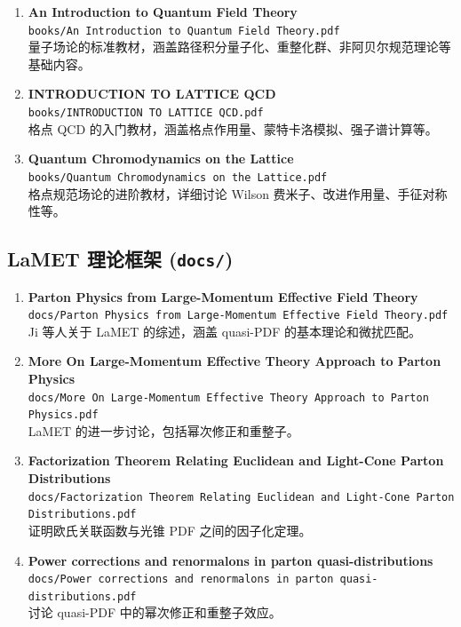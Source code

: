 \documentclass[12pt,a4paper]{ctexart}
\begin{document}
\begin{enumerate}
    \item \textbf{An Introduction to Quantum Field Theory} \\
    \texttt{books/An Introduction to Quantum Field Theory.pdf} \\
    量子场论的标准教材，涵盖路径积分量子化、重整化群、非阿贝尔规范理论等基础内容。

    \item \textbf{INTRODUCTION TO LATTICE QCD} \\
    \texttt{books/INTRODUCTION TO LATTICE QCD.pdf} \\
    格点 QCD 的入门教材，涵盖格点作用量、蒙特卡洛模拟、强子谱计算等。

    \item \textbf{Quantum Chromodynamics on the Lattice} \\
    \texttt{books/Quantum Chromodynamics on the Lattice.pdf} \\
    格点规范场论的进阶教材，详细讨论 Wilson 费米子、改进作用量、手征对称性等。
\end{enumerate}

\subsection{LaMET 理论框架 (\texttt{docs/})}

\begin{enumerate}
    \item \textbf{Parton Physics from Large-Momentum Effective Field Theory} \\
    \texttt{docs/Parton Physics from Large-Momentum Effective Field Theory.pdf} \\
    Ji 等人关于 LaMET 的综述，涵盖 quasi-PDF 的基本理论和微扰匹配。

    \item \textbf{More On Large-Momentum Effective Theory Approach to Parton Physics} \\
    \texttt{docs/More On Large-Momentum Effective Theory Approach to Parton Physics.pdf} \\
    LaMET 的进一步讨论，包括幂次修正和重整子。

    \item \textbf{Factorization Theorem Relating Euclidean and Light-Cone Parton Distributions} \\
    \texttt{docs/Factorization Theorem Relating Euclidean and Light-Cone Parton Distributions.pdf} \\
    证明欧氏关联函数与光锥 PDF 之间的因子化定理。

    \item \textbf{Power corrections and renormalons in parton quasi-distributions} \\
    \texttt{docs/Power corrections and renormalons in parton quasi-distributions.pdf} \\
    讨论 quasi-PDF 中的幂次修正和重整子效应。
\end{enumerate}
\end{document}
